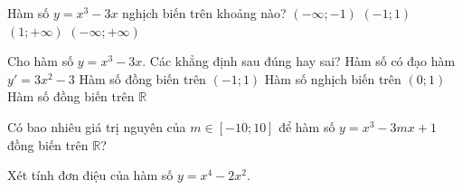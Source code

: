 
\begin{ex}%
	Hàm số $y=x^3-3x$ nghịch biến trên khoảng nào?
	\choice
	{$(-\infty;-1)$}
	{\True $(-1;1)$}
	{$(1;+\infty)$}
	{$(-\infty;+\infty)$}
\end{ex}

\begin{ex}%
	Cho hàm số $y=x^3-3x$. Các khẳng định sau đúng hay sai?
	\choiceTF
	{\True Hàm số có đạo hàm $y'=3x^2-3$}
	{Hàm số đồng biến trên $(-1;1)$}
	{\True Hàm số nghịch biến trên $(0;1)$}
	{Hàm số đồng biến trên $\mathbb{R}$}
\end{ex}

\begin{bt}%
	Có bao nhiêu giá trị nguyên của $m\in[-10;10]$ để hàm số $y=x^3-3mx+1$ đồng biến trên $\mathbb{R}$?
\end{bt}

\begin{bt}%
	Xét tính đơn điệu của hàm số $y=x^4-2x^2$.
\end{bt}
